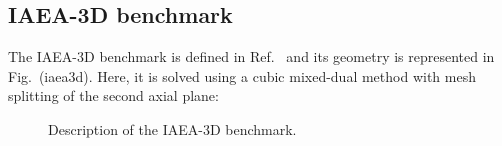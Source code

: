 \subsection{IAEA-3D benchmark}

The IAEA-3D benchmark is defined in Ref.~ and its geometry is represented in Fig.~\fig(iaea3d). Here, it is solved using a cubic mixed-dual method with mesh splitting of the second axial plane:

\begin{figure}[htbp]
\begin{center} 
\epsfxsize=15cm
\centerline{ }
\parbox{14cm}{\caption{Description of the IAEA-3D benchmark.}\label{fig:iaea3d}}  \end{center} 
\end{figure}

